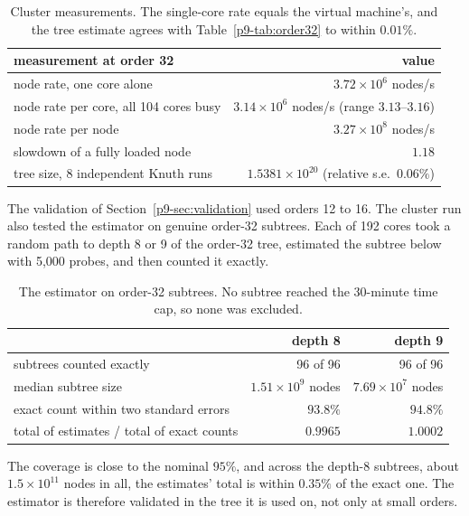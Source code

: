 \documentclass[11pt,a4paper,oneside]{report}
\theoremstyle{definition}
\begin{document}
\begin{table}[H]
\centering
\small
\begin{tabular}{@{}lr@{}}
\toprule
measurement at order 32 & value \\
\midrule
node rate, one core alone & $3.72\times10^6$ nodes/s \\
node rate per core, all 104 cores busy & $3.14\times10^6$ nodes/s (range $3.13$--$3.16$) \\
node rate per node & $3.27\times10^8$ nodes/s \\
slowdown of a fully loaded node & $1.18$ \\
tree size, 8 independent Knuth runs & $1.5381\times10^{20}$ (relative s.e.\ $0.06\%$) \\
\bottomrule
\end{tabular}
\caption{Cluster measurements. The single-core rate equals the virtual machine's, and the tree estimate
agrees with Table~\ref{p9-tab:order32} to within $0.01\%$.}
\label{p9-tab:cluster}
\end{table}

The validation of Section~\ref{p9-sec:validation} used orders 12 to 16. The cluster run also tested the
estimator on genuine order-32 subtrees. Each of 192 cores took a random path to depth 8 or 9 of the
order-32 tree, estimated the subtree below with 5{,}000 probes, and then counted it exactly.

\begin{table}[H]
\centering
\small
\begin{tabular}{@{}lrr@{}}
\toprule
& depth 8 & depth 9 \\
\midrule
subtrees counted exactly & 96 of 96 & 96 of 96 \\
median subtree size & $1.51\times10^9$ nodes & $7.69\times10^7$ nodes \\
exact count within two standard errors & $93.8\%$ & $94.8\%$ \\
total of estimates / total of exact counts & $0.9965$ & $1.0002$ \\
\bottomrule
\end{tabular}
\caption{The estimator on order-32 subtrees. No subtree reached the 30-minute time cap, so none was
excluded.}
\label{p9-tab:deepval}
\end{table}

\noindent The coverage is close to the nominal $95\%$, and across the depth-8 subtrees, about
$1.5\times10^{11}$ nodes in all, the estimates' total is within $0.35\%$ of the exact one. The estimator is
therefore validated in the tree it is used on, not only at small orders.
\end{document}
